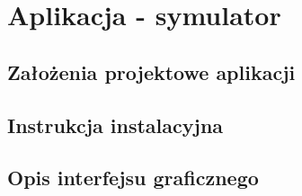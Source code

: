 \chapter{Aplikacja - symulator}
\section{Założenia projektowe aplikacji}
\section{Instrukcja instalacyjna}
\section{Opis interfejsu graficznego}